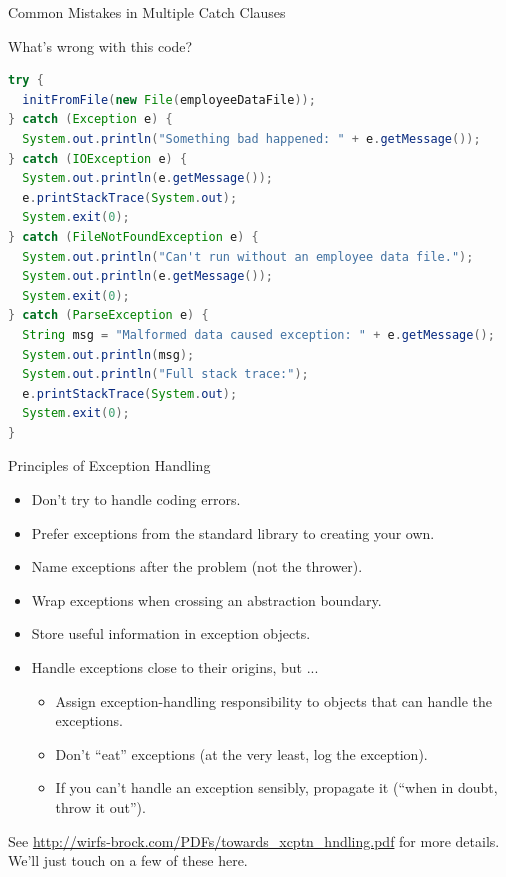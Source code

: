 \documentclass{beamer}
\begin{document}
\begin{frame}[fragile]{Common Mistakes in Multiple Catch Clauses}


What's wrong with this code?
\begin{lstlisting}[language=Java]
try {
  initFromFile(new File(employeeDataFile));
} catch (Exception e) {
  System.out.println("Something bad happened: " + e.getMessage());
} catch (IOException e) {
  System.out.println(e.getMessage());
  e.printStackTrace(System.out);
  System.exit(0);
} catch (FileNotFoundException e) {
  System.out.println("Can't run without an employee data file.");
  System.out.println(e.getMessage());
  System.exit(0);
} catch (ParseException e) {
  String msg = "Malformed data caused exception: " + e.getMessage();
  System.out.println(msg);
  System.out.println("Full stack trace:");
  e.printStackTrace(System.out);
  System.exit(0);
}
\end{lstlisting}


\end{frame}


\begin{frame}[fragile]{Principles of Exception Handling}


\begin{itemize}
\item Don't try to handle coding errors.
\item Prefer exceptions from the standard library to creating your own.
\item Name exceptions after the problem (not the thrower).
\item Wrap exceptions when crossing an abstraction boundary.
\item Store useful information in exception objects.
\item Handle exceptions close to their origins, but ...
\begin{itemize}
  \item Assign exception-handling responsibility to objects that can handle the exceptions.
  \item Don't ``eat'' exceptions (at the very least, log the exception).
  \item If you can't handle an exception sensibly, propagate it (``when in doubt, throw it out'').
\end{itemize}
\end{itemize}

See \url{http://wirfs-brock.com/PDFs/towards_xcptn_hndling.pdf} for more details.  We'll just touch on a few of these here.

\end{frame}
\end{document}

